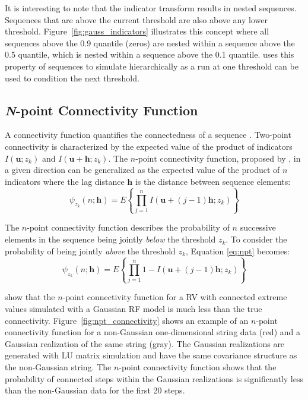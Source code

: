 It is interesting to note that the indicator transform results in nested sequences. Sequences that are above the current threshold are also above any lower threshold. Figure~\ref{fig:gauss_indicators} illustrates this concept where all sequences above the 0.9 quantile (zeros) are nested within a sequence above the 0.5 quantile, which is nested within a sequence above the 0.1 quantile. \cite{ortiz2003characterization} uses this property of sequences to simulate hierarchically as a run at one threshold can be used to condition the next threshold.

\FloatBarrier
\subsection{\textit{N}-point Connectivity Function}
\label{subsec:03npoint}

A connectivity function quantifies the connectedness of a sequence \citep{renard2011conditioning}. Two-point connectivity is characterized by the expected value of the product of indicators $I(\mathbf{u}; z_{k})$ and $I(\mathbf{u}+\mathbf{h}; z_{k})$. The $n\text{-point}$ connectivity function, proposed by \cite{journel1989nongaussian}, in a given direction can be generalized as the expected value of the product of $n$ indicators where the lag distance $\mathbf{h}$ is the distance between sequence elements:
\begin{equation}
    \psi_{z_{k}}(n;\mathbf{h}) = E\left\{\prod_{j=1}^{n} I(\mathbf{u} + (j-1)\mathbf{h}; z_{k})\right\}
    \label{eq:npt}
\end{equation}

The $n\text{-point}$ connectivity function describes the probability of $n$ successive elements in the sequence being jointly \emph{below} the threshold $z_{k}$. To consider the probability of being jointly \emph{above} the threshold $z_{k}$, Equation \ref{eq:npt} becomes:
\begin{equation}
    \psi_{z_{k}}(n;\mathbf{h}) = E\left\{\prod_{j=1}^{n} 1 - I(\mathbf{u} + (j-1)\mathbf{h}; z_{k})\right\}
    \label{eq:npt2}
\end{equation}

\cite{journel1989nongaussian} show that the $n\text{-point}$ connectivity function for a \gls{RV} with connected extreme values simulated with a Gaussian \gls{RF} model is much less than the true connectivity. Figure~\ref{fig:npt_connectivity} shows an example of an $n\text{-point}$ connectivity function for a non-Gaussian one-dimensional string data (red) and a Gaussian realization of the same string (gray). The Gaussian realizations are generated with LU matrix simulation \citep{davis1987production} and have the same covariance structure as the non-Gaussian string. The $n$-point connectivity function shows that the probability of connected steps within the Gaussian realizations is significantly less than the non-Gaussian data for the first 20 steps.


